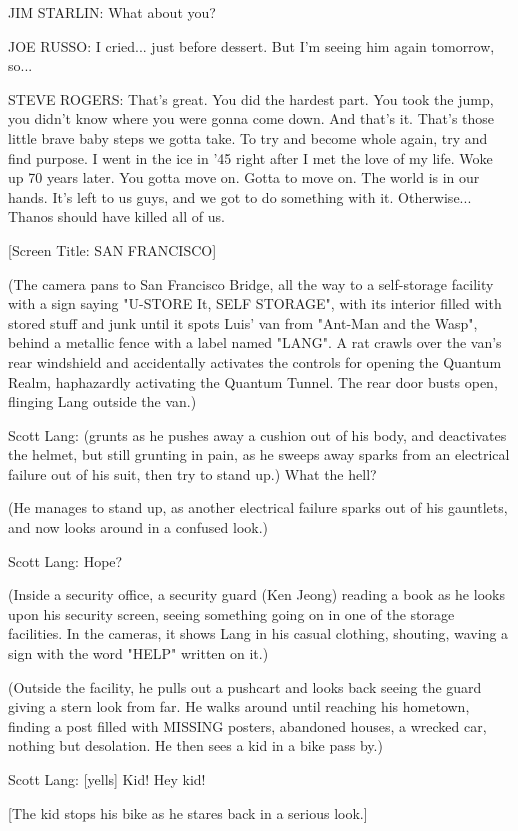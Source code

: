 JIM STARLIN: What about you?

JOE RUSSO: I cried... just before dessert. But I'm seeing him again tomorrow, so...

STEVE ROGERS: That's great. You did the hardest part. You took the jump, you didn't know where you were gonna come down. And that's it. That's those little brave baby steps we gotta take. To try and become whole again, try and find purpose. I went in the ice in '45 right after I met the love of my life. Woke up 70 years later. You gotta move on. Gotta to move on. The world is in our hands. It's left to us guys, and we got to do something with it. Otherwise... Thanos should have killed all of us.

[Screen Title: SAN FRANCISCO]

(The camera pans to San Francisco Bridge, all the way to a self-storage facility with a sign saying "U-STORE It, SELF STORAGE", with its interior filled with stored stuff and junk until it spots Luis' van from "Ant-Man and the Wasp", behind a metallic fence with a label named "LANG". A rat crawls over the van's rear windshield and accidentally activates the controls for opening the Quantum Realm, haphazardly activating the Quantum Tunnel. The rear door busts open, flinging Lang outside the van.)

Scott Lang: (grunts as he pushes away a cushion out of his body, and deactivates the helmet, but still grunting in pain, as he sweeps away sparks from an electrical failure out of his suit, then try to stand up.) What the hell?

(He manages to stand up, as another electrical failure sparks out of his gauntlets, and now looks around in a confused look.)

Scott Lang: Hope?

(Inside a security office, a security guard (Ken Jeong) reading a book as he looks upon his security screen, seeing something going on in one of the storage facilities. In the cameras, it shows Lang in his casual clothing, shouting, waving a sign with the word "HELP" written on it.)

(Outside the facility, he pulls out a pushcart and looks back seeing the guard giving a stern look from far. He walks around until reaching his hometown, finding a post filled with MISSING posters, abandoned houses, a wrecked car, nothing but desolation. He then sees a kid in a bike pass by.)

Scott Lang: [yells] Kid! Hey kid!

[The kid stops his bike as he stares back in a serious look.]

